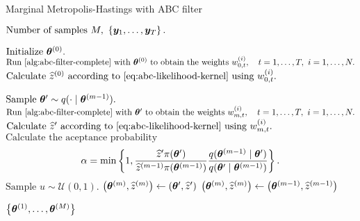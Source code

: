 \begin{algorithm}[ht]
    \caption{Marginal Metropolis-Hastings with ABC filter}
    \label{alg:marginal-metropolis-hastings-abc}
    \begin{algorithmic}[1]
        \Input $\text{Number of samples } M,\ \left\{\by_1, \ldots, \by_T\right\}.$
        
        \State $\text{Initialize } \bm{\theta}^{(0)}.$
        \State $\text{Run \autoref{alg:abc-filter-complete} with } \btheta^{(0)} \text{ to obtain the weights } w_{0,t}^{(i)}, \quad t = 1, \ldots, T,\ i = 1, \ldots, N.$
        \State $\text{Calculate } \widehat{z}^{(0)} \text{ according to \eqref{eq:abc-likelihood-kernel} using } w_{0,t}^{(i)}.$
        
        \State $\text{Sample } \bm{\theta}^\prime \sim q(\cdot \mid \bm{\theta}^{(m-1)}).$
        \State $\text{Run \autoref{alg:abc-filter-complete} with } \btheta^\prime \text{ to obtain the weights } w_{m,t}^{(i)}, \quad t = 1, \ldots, T, \ i = 1, \ldots, N.$
        \State $\text{Calculate } \widehat{z}^\prime \text{ according to \eqref{eq:abc-likelihood-kernel} using } w_{m,t}^{(i)}.$
        \State $\text{Calculate the aceptance probability } $ \begin{equation*} \label{eq:acceptance-probability-tractable-abc}
        \alpha = \min \left\{1, \frac{\widehat{z}^\prime \pi(\bm{\theta}^\prime)}{\widehat{z}^{(m-1)} \pi(\bm{\theta}^{(m-1)})} \frac{q(\bm{\theta}^{(m-1)} \mid \bm{\theta}^\prime)}{q(\bm{\theta}^\prime \mid \bm{\theta}^{(m-1)})} \right\}.
        \end{equation*}
        \State $\text{Sample } u \sim \mathcal{U}(0,1).$
        \State $\left( \bm{\theta}^{(m)}, \widehat{z}^{(m)} \right) \gets \left( \bm{\theta}^\prime, \widehat{z}^\prime \right)$ 
        \Else
        \State $\left( \bm{\theta}^{(m)}, \widehat{z}^{(m)} \right) \gets \left( \bm{\theta}^{(m-1)}, \widehat{z}^{(m-1)} \right)$ 
        \EndIf
        \EndFor
        
        \Output $\left\{ \bm{\theta}^{(1)}, \ldots, \bm{\theta}^{(M)} \right\}$
    \end{algorithmic}
\end{algorithm}